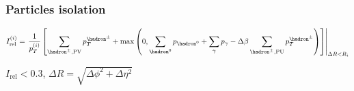 \begin{frame}\addtocounter{framenumber}{-1}
\frametitle{Particles isolation}
\begin{block}{}
\begin{equation*}
I_\text{rel}^{(i)}
=
\left.
\frac{1}{p_T^{(i)}}
\left[
\sum_{\hadron^\pm,\text{PV}} p_T^{\hadron^\pm}
+
\max\left(
0
,
\sum_{\hadron^0}p_{\hadron^0}
+
\sum_{\gamma}p_{\gamma}
- \Delta\beta
\sum_{\hadron^\pm,\text{PU}} p_T^{\hadron^\pm}
\right)
\right]
\right|_{\Delta R < R_i}
\end{equation*}
\end{block}
\begin{center}
$I_\text{rel}<\num{0.3}$,
\qquad
$\Delta R = \sqrt{\Delta\phi^2+\Delta\eta^2}$
\end{center}
\end{frame}
